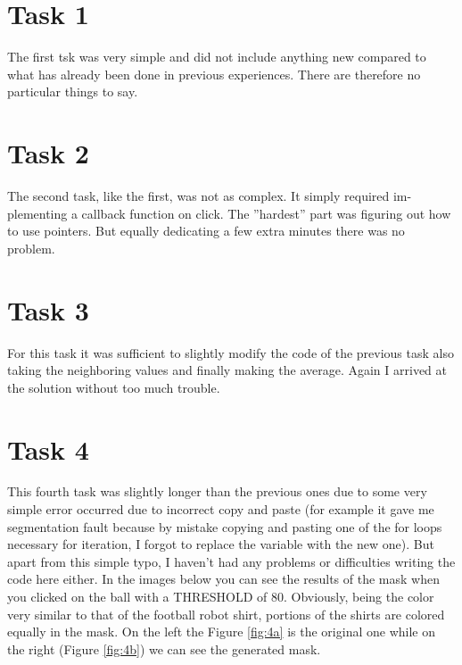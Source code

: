 
%
%         

%





\chapter{Task 1}
The first tsk was very simple and did not include anything new compared to what has already been done in previous experiences. There are therefore no particular things to say.

\chapter{Task 2}
The second task, like the first, was not as complex. It simply required im- plementing a callback function on click. The ”hardest” part was figuring out how to use pointers. But equally dedicating a few extra minutes there was no problem.


\chapter{Task 3}
For this task it was sufficient to slightly modify the code of the previous task also taking the neighboring values and finally making the average. Again I arrived at the solution without too much trouble.


\chapter{Task 4}
This fourth task was slightly longer than the previous ones due to some very simple error occurred due to incorrect copy and paste (for example it gave me segmentation fault because by mistake copying and pasting one of the for loops necessary for iteration, I forgot to replace the variable with the new one). But apart from this simple typo, I haven’t had any problems or difficulties writing the code here either. In the images below you can see the results of the mask when you clicked on the ball with a THRESHOLD of 80. Obviously, being the color very similar to that of the football robot shirt, portions of the shirts are colored equally in the mask. On the left the Figure \ref{fig:4a} is the original one while on the right (Figure \ref{fig:4b}) we can see the generated mask.


